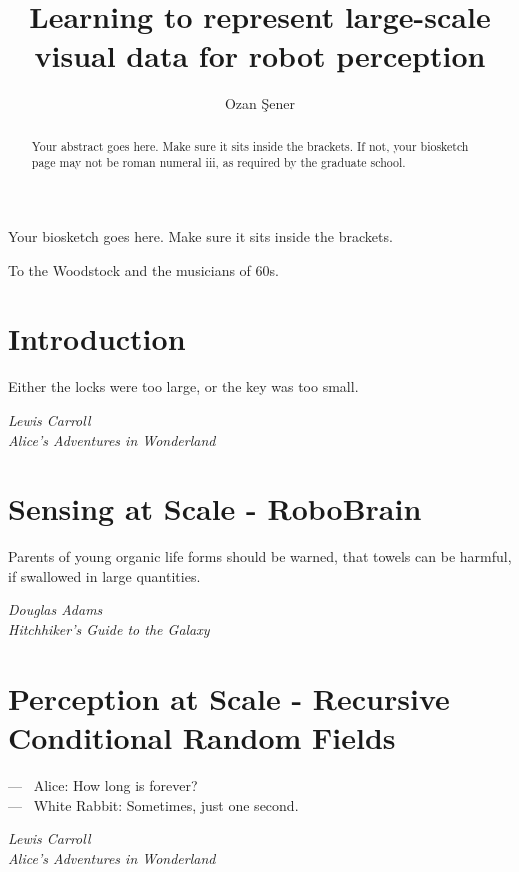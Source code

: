 \documentclass[phd,tocprelim]{cornell}
\title {Learning to represent large-scale visual data for robot perception}
\author {Ozan \c{S}ener}
\begin{document}
\maketitle
\makecopyright

\begin{abstract}
Your abstract goes here. Make sure it sits inside the brackets. If not,
your biosketch page may not be roman numeral iii, as required by the
graduate school.
\end{abstract}

\begin{biosketch}
Your biosketch goes here. Make sure it sits inside
the brackets.
\end{biosketch}

\begin{dedication}
To the Woodstock and the musicians of 60s.
\end{dedication}

\begin{acknowledgements}

\end{acknowledgements}

\contentspage
\tablelistpage
\figurelistpage

\normalspacing \setcounter{page}{1} 
\pagestyle{cornell} \addtolength{\parskip}{0.5\baselineskip}

\chapter{Introduction}
\epigraph{Either the locks were too large, or the key was too small.}{\textit{Lewis Carroll\\ Alice's Adventures in Wonderland}}


\chapter{Sensing at Scale - RoboBrain}
\epigraph{Parents of young organic life forms should be warned, that towels can be harmful, if swallowed in large quantities.}{\textit{Douglas Adams\\ Hitchhiker's Guide to the Galaxy}}


\chapter{Perception at Scale - Recursive Conditional Random Fields}
\epigraph{---~ Alice: How long is forever? \\ ---~ White Rabbit: Sometimes, just one second.}{\textit{Lewis Carroll\\ Alice's Adventures in Wonderland}}

\end{document}
